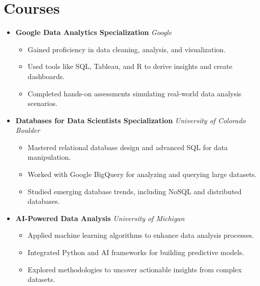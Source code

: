 \documentclass[letterpaper,11pt]{article}
\begin{document}
\section*{Courses}
\begin{itemize}[leftmargin=0.15in]
  \item \textbf{Google Data Analytics Specialization} \hfill \textit{Google}\\
  \begin{itemize}[leftmargin=0.2in]
    \item Gained proficiency in data cleaning, analysis, and visualization.
    \item Used tools like SQL, Tableau, and R to derive insights and create dashboards.
    \item Completed hands-on assessments simulating real-world data analysis scenarios.
  \end{itemize}

  \item \textbf{Databases for Data Scientists Specialization} \hfill \textit{University of Colorado Boulder}\\
  \begin{itemize}[leftmargin=0.2in]
    \item Mastered relational database design and advanced SQL for data manipulation.
    \item Worked with Google BigQuery for analyzing and querying large datasets.
    \item Studied emerging database trends, including NoSQL and distributed databases.
  \end{itemize}

  \item \textbf{AI-Powered Data Analysis} \hfill \textit{University of Michigan}\\
  \begin{itemize}[leftmargin=0.2in]
    \item Applied machine learning algorithms to enhance data analysis processes.
    \item Integrated Python and AI frameworks for building predictive models.
    \item Explored methodologies to uncover actionable insights from complex datasets.
  \end{itemize}
\end{itemize}

\end{document}
